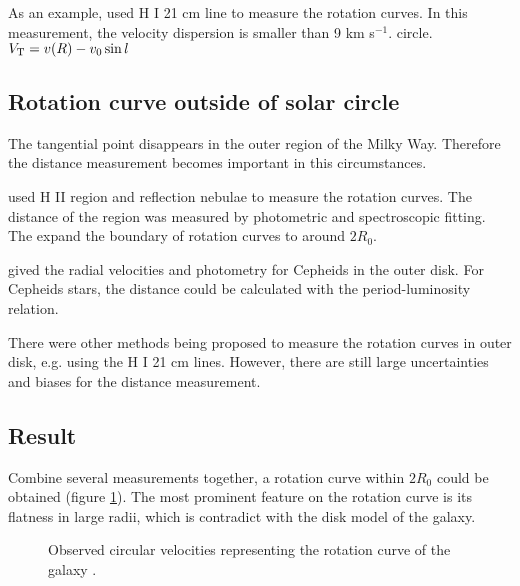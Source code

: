 \documentclass[preprint]{aastex}
\begin{document}
    As an example, \citet{1994ApJ...433..687M, 1995ApJ...448..138M} used H I 21 cm
line to measure the rotation curves. In this measurement, the velocity
dispersion is smaller than 9 km s$^{-1}$.
circle. $V_{\rm T} = v(R)-v_{0}\sin l$ %
%
    \subsection{Rotation curve outside of solar circle}
    
    The tangential point disappears in the outer region of the Milky
Way. Therefore the distance measurement becomes important in this
circumstances. \par

   \citet{1993A&A...275...67B} used H II region and reflection nebulae to
measure the rotation curves. The distance of the region was measured
by photometric and spectroscopic fitting. The expand the boundary of
rotation curves to around $2R_{0}$.\par

    \citet{1997A&A...318..416P} gived the radial velocities and photometry for
Cepheids in the outer disk. For Cepheids stars, the distance could be
calculated with the period-luminosity relation. \par

    There were other methods being proposed to measure the rotation
curves in outer disk, e.g. using the H I 21 cm lines. However, there
are still large uncertainties and biases for the distance measurement.
%

\subsection{Result}

Combine several measurements together, a
rotation curve within $2R_{0}$ could be obtained (figure
\ref{fig:rc}). The most prominent feature on the rotation curve is its
flatness in large radii, which is contradict with the disk model of
the galaxy.

     \begin{figure}[!t] \centering {}
       \caption{Observed circular velocities representing the rotation
curve of the galaxy \cite{2013pss5.book..985S}.}
       \label{fig:rc}
     \end{figure}
     
\end{document}
